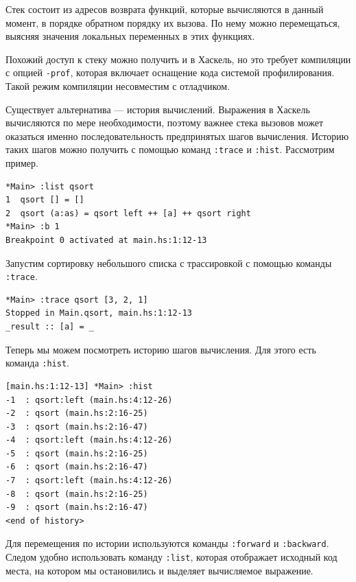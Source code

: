 \documentclass[fontsize=14pt, paper=a4, pagesize, DIV=calc]{scrartcl}
\def\code#1{\texttt{#1}}
\begin{document}
Стек состоит из адресов возврата функций, которые вычисляются в данный момент,
в порядке обратном порядку их вызова. По нему можно перемещаться, выясняя
значения локальных переменных в этих функциях.

Похожий доступ к стеку можно получить и в Хаскель, но это требует компиляции с
опцией \code{-prof}, которая включает оснащение кода системой профилирования.
Такой режим компиляции несовместим с отладчиком. 

Существует альтернатива --- история вычислений. Выражения в Хаскель вычисляются
по мере необходимости, поэтому важнее стека вызовов может оказаться именно
последовательность предпринятых шагов вычисления. Историю таких шагов можно
получить с помощью команд \code{:trace} и \code{:hist}. Рассмотрим пример.

\begin{ListingEnv}
\caption{}
\begin{lstlisting}[numbers=none]
*Main> :list qsort
1  qsort [] = []
2  qsort (a:as) = qsort left ++ [a] ++ qsort right
*Main> :b 1
Breakpoint 0 activated at main.hs:1:12-13
\end{lstlisting}
\end{ListingEnv}

Запустим сортировку небольшого списка с трассировкой с помощью команды \code{:trace}.

\begin{ListingEnv}
\caption{}
\begin{lstlisting}[numbers=none]
*Main> :trace qsort [3, 2, 1]
Stopped in Main.qsort, main.hs:1:12-13
_result :: [a] = _
\end{lstlisting}
\end{ListingEnv}

Теперь мы можем посмотреть историю шагов вычисления. Для этого есть команда
\code{:hist}.

\begin{ListingEnv}
\caption{}
\begin{lstlisting}[numbers=none]
[main.hs:1:12-13] *Main> :hist
-1  : qsort:left (main.hs:4:12-26)
-2  : qsort (main.hs:2:16-25)
-3  : qsort (main.hs:2:16-47)
-4  : qsort:left (main.hs:4:12-26)
-5  : qsort (main.hs:2:16-25)
-6  : qsort (main.hs:2:16-47)
-7  : qsort:left (main.hs:4:12-26)
-8  : qsort (main.hs:2:16-25)
-9  : qsort (main.hs:2:16-47)
<end of history> 
\end{lstlisting}
\end{ListingEnv}

Для перемещения по истории используются команды \code{:forward} и
\code{:backward}. Следом удобно использовать команду \code{:list}, которая
отображает исходный код места, на котором мы остановились и выделяет 
вычисляемое выражение.
\end{document}
